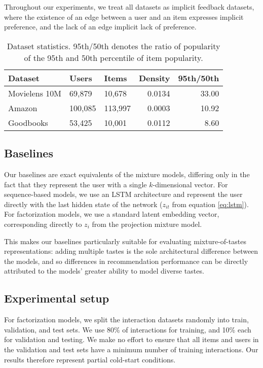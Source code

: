 \documentclass[sigconf]{acmart}
\begin{document}
Throughout our experiments, we treat all datasets as implicit feedback datasets, where the existence of an edge between a user and an item expresses implicit preference, and the lack of an edge implicit lack of preference.

\begin{table}
  \caption{Dataset statistics. 95th/50th denotes the ratio of popularity of the 95th and 50th percentile of item popularity.}
  \label{tab:datasets}
\begin{tabularx}{\columnwidth}{lllrr}
\toprule
 Dataset       & Users   & Items   &   Density &   95th/50th \\
\midrule
 Movielens 10M & 69,879  & 10,678  &    0.0134 &     33.00 \\
 Amazon        & 100,085 & 113,997 &    0.0003 &     10.92 \\
 Goodbooks     & 53,425  & 10,001  &    0.0112 &      8.60 \\
\bottomrule
\end{tabularx}
\end{table}

\subsection{Baselines}
Our baselines are exact equivalents of the mixture models, differing only in the fact that they represent the user with a single $k$-dimensional vector. For sequence-based models, we use an LSTM architecture and represent the user directly with the last hidden state of the network ($z_{it}$ from equation \ref{eq:lstm}). For factorization models, we use a standard latent embedding vector, corresponding directly to $z_i$ from the projection mixture model.

This makes our baselines particularly suitable for evaluating mixture-of-tastes representations: adding multiple tastes is the sole architectural difference between the models, and so differences in recommendation performance can be directly attributed to the models' greater ability to model diverse tastes.

\subsection{Experimental setup}
For factorization models, we split the interaction datasets randomly into train, validation, and test sets. We use 80\% of interactions for training, and 10\% each for validation and testing. We make no effort to ensure that all items and users in the validation and test sets have a minimum number of training interactions. Our results therefore represent partial cold-start conditions.
\end{document}

